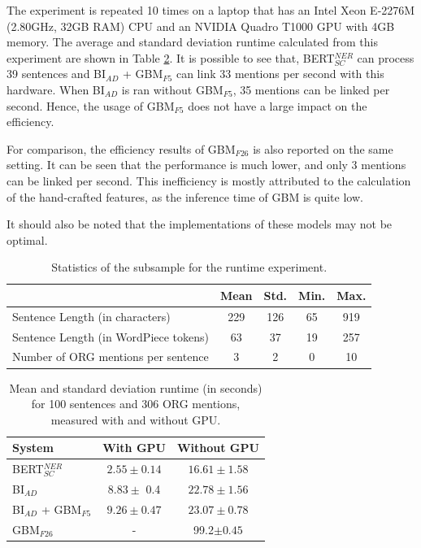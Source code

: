 \documentclass{report}
\theoremstyle{definition}
\theoremstyle{remark}
\begin{document}
The experiment is repeated 10 times on a laptop that has an Intel Xeon E-2276M (2.80GHz, 32GB RAM) CPU and an NVIDIA Quadro T1000 GPU with 4GB memory. The average and standard deviation runtime calculated from this experiment are shown in Table \ref{tab:efficiencyresults}. It is possible to see that, BERT$_{SC}^{NER}$ can process 39 sentences and BI$_{AD}$ + GBM$_{F5}$ can link 33 mentions per second with this hardware. When BI$_{AD}$ is ran without GBM$_{F5}$, 35 mentions can be linked per second. Hence, the usage of GBM$_{F5}$ does not have a large impact on the efficiency.

For comparison, the efficiency results of GBM$_{F26}$ is also reported on the same setting. It can be seen that the performance is much lower, and only 3 mentions can be linked per second. This inefficiency is mostly attributed to the calculation of the hand-crafted features, as the inference time of GBM is quite low.

It should also be noted that the implementations of these models may not be optimal.

\begin{table}[H]
    \centering
    \begin{tabular}{l|cccc}
    &  Mean & Std. & Min. & Max.\\
    \hline
    Sentence Length (in characters) &  229 & 126 & 65 & 919\\
    Sentence Length (in WordPiece tokens) & 63 & 37 & 19 & 257\\
    Number of ORG mentions per sentence & 3 & 2 & 0 & 10\\
    \end{tabular}
    \caption{Statistics of the subsample for the runtime experiment.}
    \label{tab:efficiencystats}
\end{table}

\begin{table}[H]
    \centering
    \begin{tabular}{l|cc}
    System   & With GPU & Without GPU  \\
    \hline
    BERT$_{SC}^{NER}$  & $2.55 \pm 0.14$ & $16.61 \pm 1.58$\\
    BI$_{AD}$ & $8.83 \pm $ 0.4 & $22.78 \pm 1.56$\\
    BI$_{AD}$ + GBM$_{F5}$ & $9.26 \pm 0.47$ &$23.07 \pm 0.78$\\
    GBM$_{F26}$ &-& 99.2$\pm 0.45$ \\
    \end{tabular}
    \caption{Mean and standard deviation runtime (in seconds) for 100 sentences and 306 ORG mentions, measured with and without GPU.}
    \label{tab:efficiencyresults}
\end{table}
\end{document}
